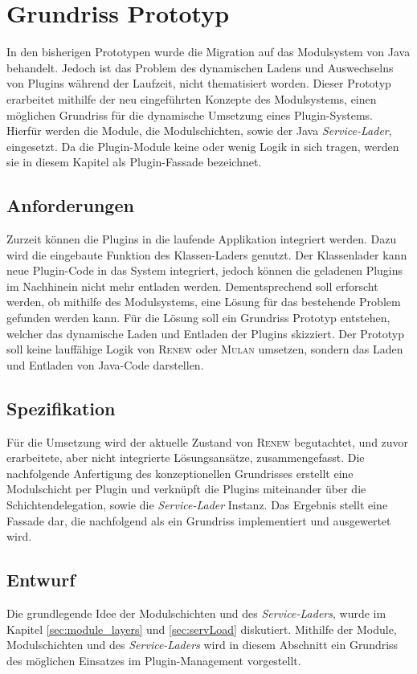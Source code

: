 \chapter{Grundriss Prototyp} \label{ch:grRiss}
	In den bisherigen Prototypen wurde die Migration auf das Modulsystem von Java behandelt. Jedoch ist das Problem des dynamischen Ladens und Auswechselns von Plugins während der Laufzeit, nicht thematisiert worden. Dieser Prototyp erarbeitet mithilfe der neu eingeführten Konzepte des Modulsystems, einen möglichen Grundriss für die dynamische Umsetzung eines Plugin-Systems. Hierfür werden die Module, die Modulschichten, sowie der Java \textit{Service-Lader}, eingesetzt. Da die Plugin-Module keine oder wenig Logik in sich tragen, werden sie in diesem Kapitel als Plugin-Fassade bezeichnet.

\section{Anforderungen} 
	Zurzeit können die Plugins in die laufende Applikation integriert werden. Dazu wird die eingebaute Funktion des Klassen-Laders genutzt. Der Klassenlader kann neue Plugin-Code in das System integriert, jedoch können die geladenen Plugins im Nachhinein nicht mehr entladen werden. Dementsprechend soll erforscht werden, ob mithilfe des Modulsystems, eine Lösung für das bestehende Problem gefunden werden kann. Für die Lösung soll ein Grundriss Prototyp entstehen, welcher das dynamische Laden und Entladen der Plugins skizziert. Der Prototyp soll keine lauffähige Logik von \textsc{Renew} oder \textsc{Mulan} umsetzen, sondern das Laden und Entladen von Java-Code darstellen.

\section{Spezifikation} 
	Für die Umsetzung wird der aktuelle Zustand von \textsc{Renew} begutachtet, und zuvor erarbeitete, aber nicht integrierte Lösungsansätze, zusammengefasst. Die nachfolgende Anfertigung des konzeptionellen Grundrisses erstellt eine Modulschicht per Plugin und verknüpft die Plugins miteinander über die Schichtendelegation, sowie die \textit{Service-Lader} Instanz. Das Ergebnis stellt eine Fassade dar, die nachfolgend als ein Grundriss implementiert und ausgewertet wird.

\section{Entwurf} \label{sec:entwurf}
	Die grundlegende Idee der Modulschichten und des \textit{Service-Laders}, wurde im Kapitel \ref{sec:module_layers} und \ref{sec:servLoad} diskutiert. Mithilfe der Module, Modulschichten und des \textit{Service-Laders} wird in diesem Abschnitt ein Grundriss des möglichen Einsatzes im Plugin-Management vorgestellt. \bigbreak

